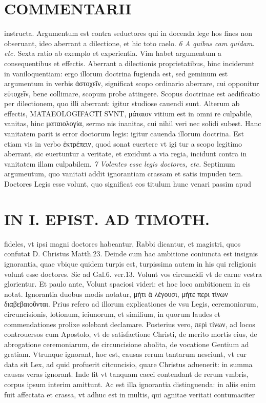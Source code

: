 \documentclass{article}
\begin{document}
\begin{pages}
\section*{COMMENTARII }
\marginpar{[ p.24 ]}\pstart instructa. Argumentum est contra seductores qui in docenda lege hos fines non obseruant, ideo aberrant a dilectione, et hic toto caelo.  \pend
\textit{6 A quibus cam quidam. etc. }\pstart Sexta ratio ab exemplo et experientia. Vim habet argumentum a consequentibus et effectis. Aberrant a dilectionis proprietatibus, hinc inciderunt in vaniloquentiam: ergo illorum doctrina fugienda est, sed geminum est argumentum in verbis ἀστοχεῖν, significat scopo ordinario aberrare, cui opponitur εὐτοχεῖν, bene collimare, scopum probe attingere. Scopus doctrinae est aedificatio per dilectionem, quo illi aberrant: igitur studiose cauendi sunt. Alterum ab effectis, MATAEOLOGIFACTI SVNT, μάταιον vitium est in omni re culpabile, vanitas, hinc ματαιολογία, sermo nis inanitas, cui nihil veri nec solidi subest. Hanc vanitatem parit is error doctorum legis: igitur cauenda illorum doctrina. Est etiam vis in verbo ἐκτρέπειν, quod sonat euertere vt igi tur a scopo legitimo aberrant, sic euertuntur a veritate, et excidunt a via regia, incidunt contra in vanitatem illam culpabilem.  \pend
\textit{7 Volentes esse legis doctores, etc. }\pstart Septimum argumeutum, quo vanitati addit ignorantiam crassam et satis impuden tem. Doctores Legis esse volunt, quo significat eos titulum hunc venari passim apud  \pend
\section*{IN I. EPIST. AD TIMOTH. }
\marginpar{[ p.25 ]}\pstart fideles, vt ipsi magni doctores habeantur, Rabbi dicantur, et magistri, quos confutat D. Christus Matth.23. Deinde cum hac ambitione coniuncta est insignis ignorantia, quae vbique quidem turpis est, turpissima autem in his qui religionis volunt esse doctores. Sic ad Gal.6. ver.13. Volunt vos circuncidi vt de carne vestra glorientur. Et paulo ante, Volunt spaciosi videri: et hoc loco ambitionem in eis notat. Ignorantia duobus modis notatur, μὴτι ἂ λέγουσι, μὴτε περι τίνων διαβεβαιοῦνται. Prius refero ad illorum explicationes de vsu Legis, ceremoniarum, circuncisionis, lotionum, ieiunorum, et similium, in quorum laudes et commendationes prolixe solebant declamare. Posterius vero, περὶ τίνων, ad locos controuersos cum Apostolo, vt de satisfactione Christi, de merito mortis eius, de abrogatione ceremoniarum, de circuncisione abolita, de vocatione Gentium ad gratiam. Vtrunque ignorant, hoc est, causas rerum tantarum nesciunt, vt cur data sit Lex, ad quid profuerit citcuncisio, quare Christus aduenerit: in summa causas veras ignorant.  \pend\pstart Inde fit vt tanquam caeci contendant de rerum vmbris, corpus ipsum interim amittunt. Ac est illa ignorantia distinguenda: in aliis enim fuit affectata et crassa, vt adhuc est in multis, qui agnitae veritati contumaciter  \pend

\end{pages}
\end{document}

